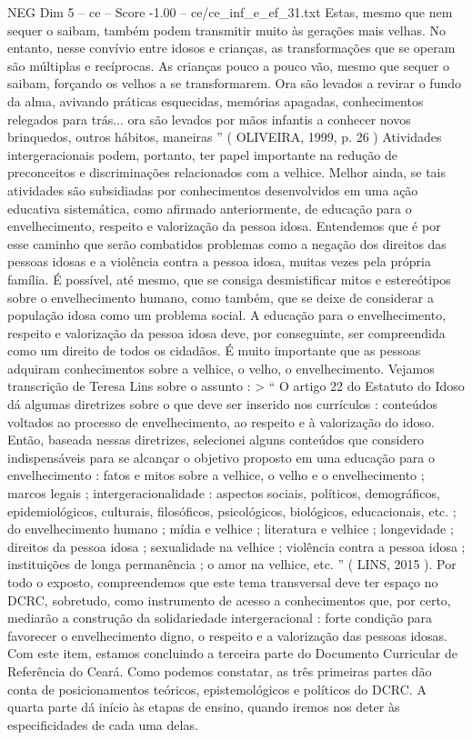 \begin{textsample}{NEG Dim 5 – ce – Score -1.00 – ce/ce\_inf\_e\_ef\_31.txt}
Estas, mesmo que nem sequer o saibam, também podem transmitir muito às gerações mais velhas.
No entanto, nesse convívio entre idosos e crianças, as transformações que se operam são múltiplas e recíprocas.
As crianças pouco a pouco vão, mesmo que sequer o saibam, forçando os velhos a se transformarem.
Ora são levados a revirar o fundo da alma, avivando práticas esquecidas, memórias apagadas, conhecimentos relegados para trás... ora são levados por mãos infantis a conhecer novos brinquedos, outros hábitos, maneiras ” ( OLIVEIRA, 1999, p. 26 ) Atividades intergeracionais podem, portanto, ter papel importante na redução de preconceitos e discriminações relacionados com a velhice.
Melhor ainda, se tais atividades são subsidiadas por conhecimentos desenvolvidos em uma ação educativa sistemática, como afirmado anteriormente, de educação para o envelhecimento, respeito e valorização da pessoa idosa.
Entendemos que é por esse caminho que serão combatidos problemas como a negação dos direitos das pessoas idosas e a violência contra a pessoa idosa, muitas vezes pela própria família.
É possível, até mesmo, que se consiga desmistificar mitos e estereótipos sobre o envelhecimento humano, como também, que se deixe de considerar a população idosa como um problema social.
A educação para o envelhecimento, respeito e valorização da pessoa idosa deve, por conseguinte, ser compreendida como um direito de todos os cidadãos.
É muito importante que as pessoas adquiram conhecimentos sobre a velhice, o velho, o envelhecimento.
Vejamos transcrição de Teresa Lins sobre o assunto : > “ O artigo 22 do Estatuto do Idoso dá algumas diretrizes sobre o que deve ser inserido nos currículos : conteúdos voltados ao processo de envelhecimento, ao respeito e à valorização do idoso.
Então, baseada nessas diretrizes, selecionei alguns conteúdos que considero indispensáveis para se alcançar o objetivo proposto em uma educação para o envelhecimento : fatos e mitos sobre a velhice, o velho e o envelhecimento ; marcos legais ; intergeracionalidade : aspectos sociais, políticos, demográficos, epidemiológicos, culturais, filosóficos, psicológicos, biológicos, educacionais, etc. ; do envelhecimento humano ; mídia e velhice ; literatura e velhice ; longevidade ; direitos da pessoa idosa ; sexualidade na velhice ; violência contra a pessoa idosa ; instituições de longa permanência ; o amor na velhice, etc. ” ( LINS, 2015 ).
Por todo o exposto, compreendemos que este tema transversal deve ter espaço no DCRC, sobretudo, como instrumento de acesso a conhecimentos que, por certo, mediarão a construção da solidariedade intergeracional : forte condição para favorecer o envelhecimento digno, o respeito e a valorização das pessoas idosas.
Com este item, estamos concluindo a terceira parte do Documento Curricular de Referência do Ceará.
Como podemos constatar, as três primeiras partes dão conta de posicionamentos teóricos, epistemológicos e políticos do DCRC.
A quarta parte dá início às etapas de ensino, quando iremos nos deter às especificidades de cada uma delas.

\end{textsample}
